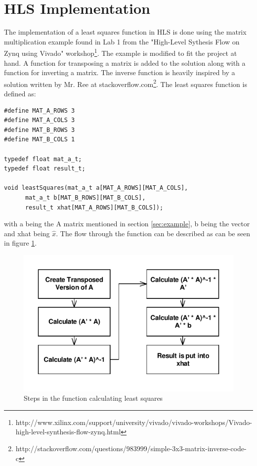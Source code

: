 \section{HLS Implementation}
The implementation of a least squares function in HLS is done using the matrix multiplication example found in Lab 1 from the "High-Level Sythesis Flow on Zynq using Vivado" workshop\footnote{http://www.xilinx.com/support/university/vivado/vivado-workshops/Vivado-high-level-synthesis-flow-zynq.html}. The example is modified to fit the project at hand. A function for transposing a matrix is added to the solution along with a function for inverting a matrix. The inverse function is heavily inspired by a solution written by Mr. Ree at stackoverflow.com\footnote{http://stackoverflow.com/questions/983999/simple-3x3-matrix-inverse-code-c}.
The least squares function is defined as:
\begin{lstlisting}[caption={Least Squares function definition},label=lstsquares]
#define MAT_A_ROWS 3
#define MAT_A_COLS 3
#define MAT_B_ROWS 3
#define MAT_B_COLS 1

typedef float mat_a_t;
typedef float result_t;

void leastSquares(mat_a_t a[MAT_A_ROWS][MAT_A_COLS],
      mat_a_t b[MAT_B_ROWS][MAT_B_COLS],
      result_t xhat[MAT_A_ROWS][MAT_B_COLS]);
\end{lstlisting}
with a being the A matrix mentioned in section \ref{sec:example}, b being the vector and xhat being $\hat{x}$. The flow through the function can be described as can be seen in figure \ref{fig:LSFunc}.
\begin{figure}[H]
\centering
\includegraphics[scale=1]{billeder/leastSquaresFunc}
\caption{Steps in the function calculating least squares}
\label{fig:LSFunc}
\end{figure}

